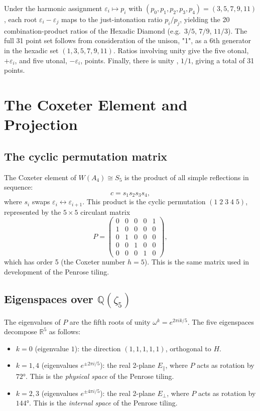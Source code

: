 \documentclass[11pt]{article}
\begin{document}
Under the harmonic assignment $\varepsilon_i \mapsto p_i$ with
$(p_0,p_1,p_2,p_3,p_4) = (3,5,7,9,11)$, each root $\varepsilon_i - \varepsilon_j$
maps to the just-intonation ratio $p_i / p_j$, yielding the 20 combination-product
ratios of the Hexadic Diamond (e.g.\ $3/5$, $7/9$, $11/3$). The full 31 point set
follows from consideration of the unison, "1", as a 6th generator in the hexadic
set $(1, 3, 5, 7, 9, 11)$. Ratios involving unity give the five otonal, $+\varepsilon_{i}$, and
five utonal, $-\varepsilon_{i}$, points. Finally, there is unity , $1/1$, giving a total of 31 points.


\section{The Coxeter Element and Projection}

\subsection{The cyclic permutation matrix}

The Coxeter element of $W(A_4) \cong S_5$ is the product of all simple
reflections in sequence:
\[
  c = s_1 s_2 s_3 s_4,
\]
where $s_i$ swaps $\varepsilon_i \leftrightarrow \varepsilon_{i+1}$. This
product is the cyclic permutation $(1\;2\;3\;4\;5)$, represented by the
$5\times 5$ circulant matrix
\[
  P = \begin{pmatrix}
    0 & 0 & 0 & 0 & 1 \\
    1 & 0 & 0 & 0 & 0 \\
    0 & 1 & 0 & 0 & 0 \\
    0 & 0 & 1 & 0 & 0 \\
    0 & 0 & 0 & 1 & 0
  \end{pmatrix},
\]
which has order 5 (the Coxeter number $h = 5$).  This is the same matrix used in
development of the Penrose tiling.

\subsection{Eigenspaces over $\mathbb{Q}(\zeta_5)$}

The eigenvalues of $P$ are the fifth roots of unity $\omega^k = e^{2\pi i k/5}$.
The five eigenspaces decompose $\mathbb{R}^5$ as follows:
\begin{itemize}
  \item $k=0$ (eigenvalue $1$): the direction $(1,1,1,1,1)$, orthogonal to $H$.
  \item $k=1,4$ (eigenvalues $e^{\pm 2\pi i/5}$): the real 2-plane $E_\parallel$,
        where $P$ acts as rotation by $72°$. This is the \emph{physical space}
        of the Penrose tiling.
  \item $k=2,3$ (eigenvalues $e^{\pm 4\pi i/5}$): the real 2-plane $E_\perp$,
        where $P$ acts as rotation by $144°$. This is the \emph{internal space}
        of the Penrose tiling.
\end{itemize}
\end{document}
